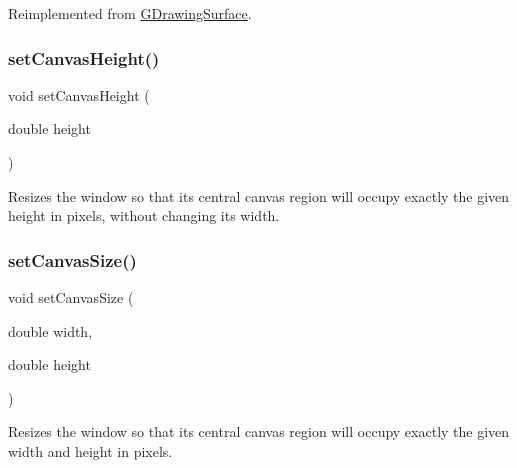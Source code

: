 Reimplemented from \mbox{\hyperlink{classsgl_1_1GDrawingSurface_ab4677ab2474e68b07aa56605af92a84a}{G\+Drawing\+Surface}}.

\mbox{\label{classsgl_1_1GWindow_a059f69fab57ad2cca2243c5a64f7306d}} 
\subsubsection{\texorpdfstring{set\+Canvas\+Height()}{setCanvasHeight()}}
{\footnotesize\ttfamily void set\+Canvas\+Height (\begin{DoxyParamCaption}\item[{double}]{height }\end{DoxyParamCaption})\hspace{0.3cm}{\ttfamily [virtual]}}



Resizes the window so that its central canvas region will occupy exactly the given height in pixels, without changing its width. 

\mbox{\label{classsgl_1_1GWindow_a06022723e253be88ca7e48034ff66244}} 
\subsubsection{\texorpdfstring{set\+Canvas\+Size()}{setCanvasSize()}\hspace{0.1cm}{\footnotesize\ttfamily [1/2]}}
{\footnotesize\ttfamily void set\+Canvas\+Size (\begin{DoxyParamCaption}\item[{double}]{width,  }\item[{double}]{height }\end{DoxyParamCaption})\hspace{0.3cm}{\ttfamily [virtual]}}



Resizes the window so that its central canvas region will occupy exactly the given width and height in pixels. 

\mbox{\label{classsgl_1_1GWindow_a22f0f065a223a3c0ae5173316ece1dc1}} 

